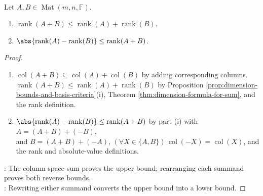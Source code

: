\begin{theorem} \label{thm:rank-triangle-inequality} \\
Let $A,B\in\operatorname{Mat}(m,n,\mathbb{F})$.
\begin{enumerate}[label=(\roman*)]
\setlength{\itemsep}{0pt}
\item $\operatorname{rank}(A+B)\leq\operatorname{rank}(A)+\operatorname{rank}(B)$.
\item $\abs{\operatorname{rank}(A)-\operatorname{rank}(B)}\leq\operatorname{rank}(A+B)$.
\end{enumerate}
\begin{proof}
\begin{enumerate}[label=(\roman*)]
\setlength{\itemsep}{0pt}
\item $\operatorname{col}(A+B)\subseteq\operatorname{col}(A)+\operatorname{col}(B)$ by adding corresponding columns.\\
$\operatorname{rank}(A+B)\leq\operatorname{rank}(A)+\operatorname{rank}(B)$ by Proposition \ref{prop:dimension-bounds-and-basis-criteria}(i), Theorem \ref{thm:dimension-formula-for-sum}, and the rank definition.
\item $\abs{\operatorname{rank}(A)-\operatorname{rank}(B)}\leq\operatorname{rank}(A+B)$ by part (i) with $A=(A+B)+(-B)$,\\
and $B=(A+B)+(-A)$, $(\forall X\in\{A,B\})\,\operatorname{col}(-X)=\operatorname{col}(X)$, and the rank and absolute-value definitions.
\end{enumerate}
: The column-space sum proves the upper bound; rearranging each summand proves both reverse bounds.\\
: Rewriting either summand converts the upper bound into a lower bound.
\end{proof}
\end{theorem}

